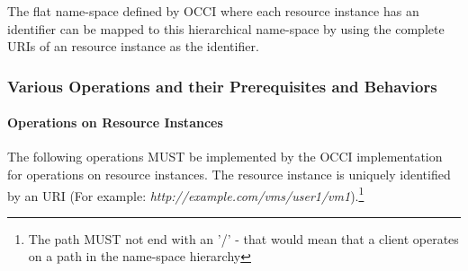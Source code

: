 \documentclass[10pt,a4paper]{article}
\begin{document}
The flat name-space defined by OCCI where each resource instance has an
identifier can be mapped to this hierarchical name-space by using the
complete URIs of an resource instance as the identifier.

\subsubsection{Various Operations and their Prerequisites and Behaviors}

\paragraph{Operations on Resource Instances}
The following operations MUST be implemented by the OCCI
implementation for operations on resource instances. The resource
instance is uniquely identified by an URI (For example:
\emph{http://example.com/vms/user1/vm1}).\footnote{The path MUST not
  end with an '/' - that would mean that a client operates on a path
  in the name-space hierarchy}
\end{document}
